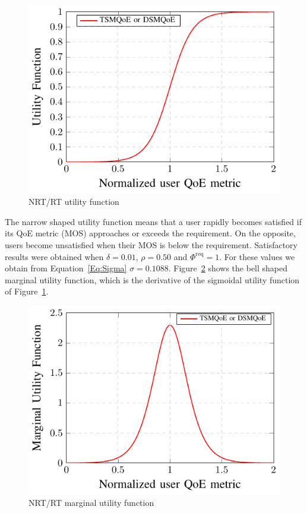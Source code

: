 \documentclass[conference]{IEEEtran}
\newcommand{\FigRef}[1]{Figure~\ref{#1}}
\newcommand{\EqRef}[1]{Equation~\ref{#1}}
\begin{document}
\begin{figure}
	\centering
	\includegraphics[width=0.55\linewidth]{figs_wp2/figs_BRUNO_PEDRO/userUtility}
	\caption{NRT/RT utility function}	
	\label{Fig:UserUtility}
\end{figure}	

The narrow shaped utility function   means that a user rapidly becomes satisfied if its \ac{QoE} metric (\ac{MOS}) approaches or exceeds the requirement. On the opposite, users become unsatisfied when their \ac{MOS} is below the requirement. Satisfactory results  were obtained when $ \delta = 0.01$, $\rho = 0.50$ and $\Phi^{\text{req}} = 1$. For these values we obtain from \EqRef{Eq:Sigma} $\sigma = 0.1088$. \FigRef{Fig:Bell} shows the bell shaped marginal utility function, which is the derivative of the sigmoidal utility function of \FigRef{Fig:UserUtility}. 	

\begin{figure}
	\centering
	\includegraphics[width=0.55\linewidth]{figs_wp2/figs_BRUNO_PEDRO/sino}
	\caption{NRT/RT marginal utility function}	
	\label{Fig:Bell}	
\end{figure}

\end{document}
